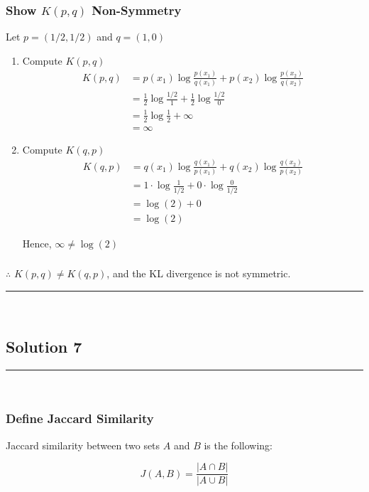 \documentclass{article}
\begin{document}
\subsubsection*{Show $K(p, q)$ Non-Symmetry}
\begin{flushleft}
  Let $p = (1/2, 1/2)$ and $q = (1, 0)$
\end{flushleft}
\begin{enumerate}
  \item Compute $K(p,q)$
  \begin{align*}
    K(p, q) &= p(x_1) \log\frac{p(x_1)}{q(x_1)} + p(x_2) \log\frac{p(x_2)}{q(x_2)} \\
    &= \frac{1}{2} \log\frac{1/2}{1} + \frac{1}{2} \log\frac{1/2}{0} \\
    &= \frac{1}{2} \log\frac{1}{2} + \infty \\
    &= \infty
\end{align*}
  \item Compute $K(q,p)$
  \begin{align*}
    K(q, p) &= q(x_1) \log\frac{q(x_1)}{p(x_1)} + q(x_2) \log\frac{q(x_2)}{p(x_2)} \\
    &= 1 \cdot \log\frac{1}{1/2} + 0 \cdot \log\frac{0}{1/2} \\
    &= \log(2) + 0 \\
    &= \log(2)
\end{align*}
\begin{flushleft}
  Hence, $\infty \neq \log(2)$
\end{flushleft}
\end{enumerate}

\subsubsection*{\normalfont}{$\therefore$ $K(p, q) \neq K(q, p)$, and the KL divergence is not symmetric.}

\noindent\rule{\textwidth}{0.4pt}\\

\newpage

\subsection*{Solution 7}
\noindent\rule{\textwidth}{0.4pt}\\

\subsubsection*{Define Jaccard Similarity}
\parbox{\textwidth}{
Jaccard similarity between two sets $A$ and $B$ is the following:

$$J(A,B) = \frac{|A \cap B|}{|A \cup B|}$$
}
\end{document}
